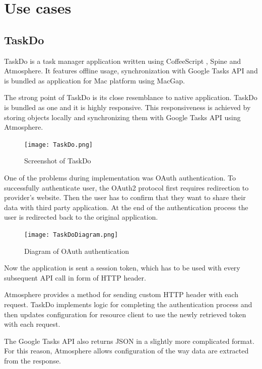 \section{Use cases}

\subsection{TaskDo}

TaskDo \citep{taskdo} is a task manager application written using CoffeeScript \citep{coffeescript}, Spine \citep{spinejs} and Atmosphere. It features offline usage, synchronization with Google Tasks API \citep{google_tasks} and is bundled as application for Mac platform using MacGap. \citep{macgap}

The strong point of TaskDo is its close resemblance to native application. TaskDo is bundled as one and it is highly responsive. This responsiveness is achieved by storing objects locally and synchronizing them with Google Tasks API using Atmosphere.

\begin{figure}[htbp]
  \centering
    \texttt{[image: TaskDo.png]}
  \caption{Screenshot of TaskDo}
  \label{fig:taskdo}
\end{figure}

One of the problems during implementation was OAuth authentication. To successfully authenticate user, the OAuth2 protocol \citep{oauth} first requires redirection to provider's website. Then the user has to confirm that they want to share their data with third party application. At the end of the authentication process the user is redirected back to the original application.

\begin{figure}[ht!]
  \centering
    \texttt{[image: TaskDoDiagram.png]}
  \caption{Diagram of OAuth authentication}
  \label{fig:taskdo_diagram}
\end{figure}

Now the application is sent a session token, which has to be used with every subsequent API call in form of HTTP header.

Atmosphere provides a method for sending custom HTTP header with each request. TaskDo implements logic for completing the authentication process and then updates configuration for resource client to use the newly retrieved token with each request.

The Google Tasks API also returns JSON in a slightly more complicated format. For this reason, Atmosphere allows configuration of the way data are extracted from the response.

